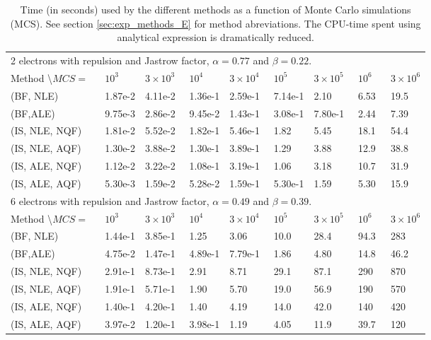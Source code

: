 \begin{table}[h!]
	\centering 
	\begin{tabular}{l @{ } l @{ } l @{ } l @{ } l @{ } l @{ } l @{ } l @{ } l }
	\toprule
	\multicolumn{9}{l}{2 electrons with repulsion and Jastrow factor, $\alpha = 0.77$ and $\beta = 0.22$.} \\
	Method \textbackslash $MCS = ~~~$ & $10^3~~~~~~~$ & $3\times 10^3~~$ & $10^4~~~~~~~$ & $3\times 10^4~~$ & $10^5~~~~~~~$ & $3\times 10^5~~$ & $10^6~~~~$ & $3\times 10^6$ \\
	\midrule
	(BF, NLE) & 1.87e-2 & 4.11e-2 & 1.36e-1 & 2.59e-1 & 7.14e-1 & 2.10 & 6.53 & 19.5 \\
	\shaderow (BF,ALE) & 9.75e-3 & 2.86e-2 & 9.45e-2 & 1.43e-1 & 3.08e-1 & 7.80e-1 & 2.44 & 7.39 \\
	(IS, NLE, NQF) & 1.81e-2 & 5.52e-2 & 1.82e-1 & 5.46e-1 & 1.82 & 5.45 & 18.1 & 54.4 \\
	\shaderow (IS, NLE, AQF) & 1.30e-2 & 3.88e-2 & 1.30e-1 & 3.89e-1 & 1.29 & 3.88 & 12.9 & 38.8 \\
	(IS, ALE, NQF) & 1.12e-2 & 3.22e-2 & 1.08e-1 & 3.19e-1 & 1.06 & 3.18 & 10.7 & 31.9 \\
	\shaderow (IS, ALE, AQF) & 5.30e-3 & 1.59e-2 & 5.28e-2 & 1.59e-1 & 5.30e-1 & 1.59 & 5.30 & 15.9 \\
	\bottomrule
	\toprule
	\multicolumn{9}{l}{6 electrons with repulsion and Jastrow factor, $\alpha = 0.49$ and $\beta = 0.39$.} \\
	Method \textbackslash $MCS = ~~~$ & $10^3~~~~~~~$ & $3\times 10^3~~$ & $10^4~~~~~~~$ & $3\times 10^4~~$ & $10^5~~~~~~~$ & $3\times 10^5~~$ & $10^6~~~~$ & $3\times 10^6$ \\
	\midrule
	(BF, NLE) &  1.44e-1 & 3.85e-1 & 1.25 & 3.06 & 10.0 & 28.4 & 94.3 & 283 \\
	\shaderow (BF,ALE) &  4.75e-2 & 1.47e-1 & 4.89e-1 & 7.79e-1 & 1.86 & 4.80 & 14.8 & 46.2 \\
	(IS, NLE, NQF) & 2.91e-1 & 8.73e-1 & 2.91 & 8.71 & 29.1 & 87.1 & 290 & 870 \\
	\shaderow (IS, NLE, AQF) & 1.91e-1 & 5.71e-1 & 1.90 & 5.70 & 19.0 & 56.9 & 190 & 570 \\
	(IS, ALE, NQF) & 1.40e-1 & 4.20e-1 & 1.40 & 4.19 & 14.0 & 42.0 & 140 & 420 \\
	\shaderow (IS, ALE, AQF) & 3.97e-2 & 1.20e-1 & 3.98e-1 & 1.19 & 4.05 & 11.9 & 39.7 & 120 \\
	\bottomrule
	\end{tabular}
	\caption{Time (in seconds) used by the different methods as a function of Monte Carlo simulations (MCS).
			See section \ref{sec:exp_methods_E} for method abreviations.
			The CPU-time spent using analytical expression is dramatically reduced. }
	\label{tab:res_times}
\end{table}


